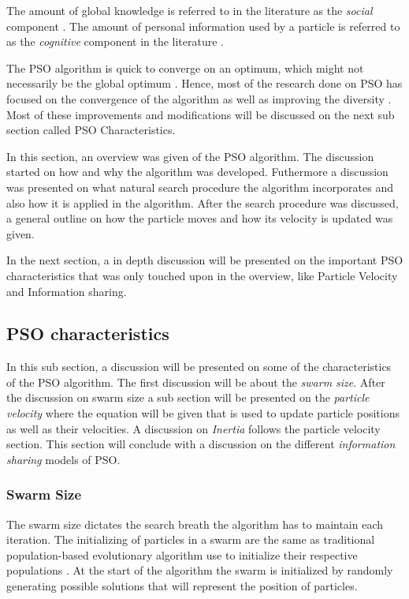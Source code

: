 The amount of global knowledge is referred to in the literature as the \emph{social} \label{def:socialcomponent} component \cite{FundamentalSwarm,CompuIntelligenceIntro,PSOSelfHierarch,SOSwarm}. The amount of personal information used by a particle is referred to as the \emph{cognitive} \label{def:cognitivecomponent} component in the literature \cite{FundamentalSwarm,CompuIntelligenceIntro,PSOSelfHierarch,SOSwarm}.

The PSO algorithm is quick to converge on an optimum, which might not necessarily be the global optimum \cite{PSOSelfHierarch}. Hence, most of the research done on PSO has focused on the convergence of the algorithm as well as improving the diversity \cite{FundamentalSwarm}. Most of these improvements and modifications will be discussed on the next sub section called PSO Characteristics.

In this section, an overview was given of the PSO algorithm. The discussion started on how and why the algorithm was developed. Futhermore a discussion was presented on what natural search procedure the algorithm incorporates and also how it is applied in the algorithm. After the search procedure was discussed, a general outline on how the particle moves and how its velocity is updated was given. 

In the next section, a in depth discussion will be presented on the important PSO characteristics that was only touched upon in the overview, like Particle Velocity and Information sharing.

\subsection{PSO characteristics}
In this sub section, a discussion will be presented on some of the characteristics of the PSO algorithm. The first discussion will be about the \emph{swarm size}. After the discussion on swarm size a sub section will be presented on the \emph{particle velocity} where the equation will be given that is used to update particle positions as well as their velocities. A discussion on \emph{Inertia} follows the particle velocity section. This section will conclude with a discussion on the different \emph{information sharing} models of PSO.
\subsubsection{Swarm Size}
The swarm size dictates the search breath the algorithm has to maintain each iteration\cite{FixedFAPPSO,CompuIntelligenceIntro}. The initializing of particles in a swarm are the same as traditional population-based evolutionary algorithm use to initialize their respective populations \cite{FixedFAPPSO}.  At the start of the algorithm the swarm is initialized by randomly generating possible solutions that will represent the position of particles\cite{CompuIntelligenceIntro}. 

